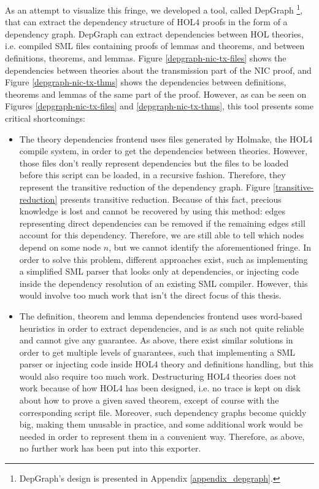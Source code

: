 \documentclass{kththesis}
\begin{document}
{As an attempt to visualize this fringe, we developed a tool, called DepGraph \footnote{DepGraph's design is presented in Appendix \ref{appendix_depgraph}.}, that can extract the dependency structure of HOL4 proofs in the form of a dependency graph. DepGraph can extract dependencies between HOL theories, i.e. compiled \gls{SML} files containing proofs of lemmas and theorems, and between definitions, theorems, and lemmas. Figure \ref{depgraph-nic-tx-files} shows the dependencies between theories about the transmission part of the NIC proof, and Figure \ref{depgraph-nic-tx-thms} shows the dependencies between definitions, theorems and lemmas of the same part of the proof. However, as can be seen on Figures \ref{depgraph-nic-tx-files} and \ref{depgraph-nic-tx-thms}, this tool presents some critical shortcomings:

\begin{itemize}
	\item The theory dependencies frontend uses files generated by Holmake, the HOL4 compile system, in order to get the dependencies between theories. However, those files don't really represent dependencies but the files to be loaded before this script can be loaded, in a recursive fashion. Therefore, they represent the transitive reduction of the dependency graph. Figure \ref{transitive-reduction} presents transitive reduction. Because of this fact, precious knowledge is lost and cannot be recovered by using this method: edges representing direct dependencies can be removed if the remaining edges still account for this dependency. Therefore, we are still able to tell which nodes depend on some node $n$, but we cannot identify the aforementioned fringe. In order to solve this problem, different approaches exist, such as implementing a simplified SML parser that looks only at dependencies, or injecting code inside the dependency resolution of an existing SML compiler. However, this would involve too much work that isn't the direct focus of this thesis.
	\item The definition, theorem and lemma dependencies frontend uses word-based heuristics in order to extract dependencies, and is as such not quite reliable and cannot give any guarantee. As above, there exist similar solutions in order to get multiple levels of guarantees, such that implementing a SML parser or injecting code inside HOL4 theory and definitions handling, but this would also require too much work. Destructuring HOL4 theories does not work because of how HOL4 has been designed, i.e. no trace is kept on disk about how to prove a given saved theorem, except of course with the corresponding script file. Moreover, such dependency graphs become quickly big, making them unusable in practice, and some additional work would be needed in order to represent them in a convenient way. Therefore, as above, no further work has been put into this exporter.
\end{itemize}

}
\end{document}
